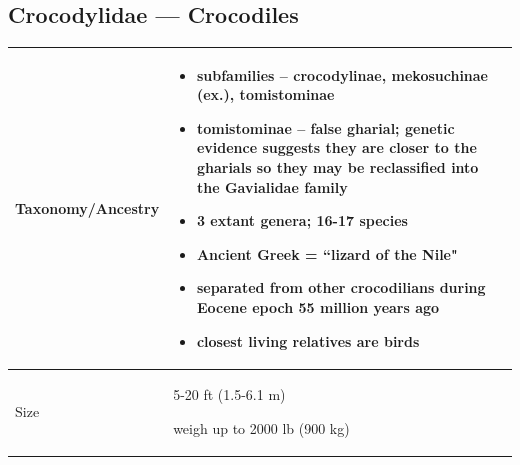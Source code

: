 
\subsection{Crocodylidae --- Crocodiles}
\begin{center}
\begin{longtabu} to 
	\hline
	Taxonomy/Ancestry & 
	\begin{itemize}[noitemsep]
		\item subfamilies -- crocodylinae, mekosuchinae (ex.), tomistominae
		\item \textbf{tomistominae} -- false gharial; genetic evidence suggests they are closer to the gharials so they may be reclassified into the Gavialidae family
		\item 3 extant genera; 16-17 species
		\item Ancient Greek = ``lizard of the Nile"
		\item separated from other crocodilians during Eocene epoch 55 million years ago
		\item closest living relatives are birds
	\end{itemize}
	\\
	\hline
	Size & 
	5-20 ft (1.5-6.1 m)
	
	weigh up to 2000 lb (900 kg)
	

\end{longtabu}
\end{center}
